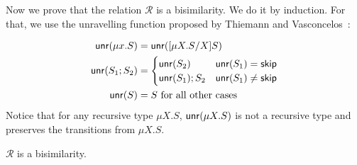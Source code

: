 Now we prove that the relation $\mathcal{R}$ is a bisimilarity. We do it
by induction. For that, we use the unravelling function proposed 
by Thiemann and Vasconcelos~\cite{thiemann2016context}:

\[\begin{aligned}
\mathsf{unr}(\mu x . S) &= \mathsf{unr}([{\mu X.S}/{X}] S)\\
\mathsf{unr}(S_1;S_2) &= 
\begin{cases}
	\mathsf{unr}(S_2) & \mathsf{unr}(S_1)=\mathsf{skip}\\
	\mathsf{unr}(S_1);S_2 & \mathsf{unr}(S_1)\neq\mathsf{skip}\\
\end{cases} \\
\mathsf{unr}(S)&= S \text{  for all other cases}
\end{aligned}\]
%
Notice that for any recursive type 
$\mu X.S$, $\mathsf{unr}(\mu X.S)$ is not a recursive type and preserves the 
transitions from $\mu X.S$.

\begin{theorem}
\label{thm:cfst_vs_grammar}
	$\mathcal{R}$ is a bisimilarity.
\end{theorem}

